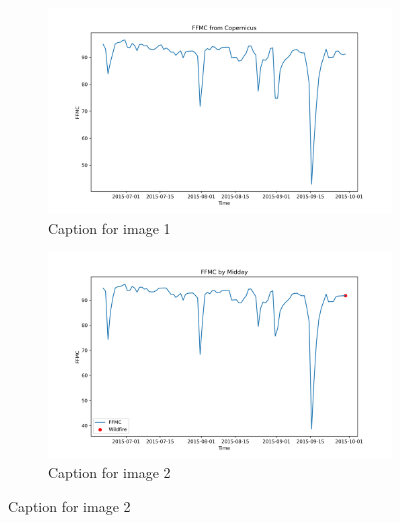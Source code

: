 \begin{figure}[h]
\caption{HELLo}
    \centering
    \begin{subfigure}{0.49\textwidth}
        \centering
        \includegraphics[width=\textwidth]{graphs/2015MesmoSitio/2015CopernicusFFMC12.png}
        \caption{Caption for image 1}
        \label{fig:img1}
    \end{subfigure}
    \hfill
    \begin{subfigure}{0.49\textwidth}
        \centering
        \includegraphics[width=\textwidth]{graphs/2015MesmoSitio/2015CalcFFMC12.png}
        \caption{Caption for image 2}
        \label{fig:img2}
    \end{subfigure}
    \label{fig:both_images}
\end{figure}

